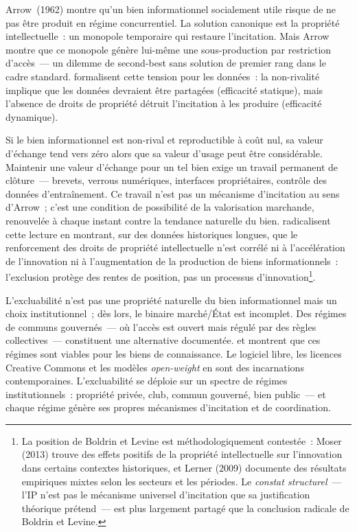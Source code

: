  Arrow~(1962) montre qu'un bien informationnel socialement utile risque de ne pas être produit en régime concurrentiel. La solution canonique est la propriété intellectuelle~: un monopole temporaire qui restaure l'incitation. Mais Arrow montre que ce monopole génère lui-même une sous-production par restriction d'accès~--- un dilemme de second-best sans solution de premier rang dans le cadre standard. \textcite{jones_nonrivalry_2020} formalisent cette tension pour les données~: la non-rivalité implique que les données devraient être partagées (efficacité statique), mais l'absence de droits de propriété détruit l'incitation à les produire (efficacité dynamique).

 Si le bien informationnel est non-rival et reproductible à coût nul, sa valeur d'échange tend vers zéro alors que sa valeur d'usage peut être considérable. Maintenir une valeur d'échange pour un tel bien exige un travail permanent de clôture~--- brevets, verrous numériques, interfaces propriétaires, contrôle des données d'entraînement. Ce travail n'est pas un mécanisme d'incitation au sens d'Arrow~; c'est une condition de possibilité de la valorisation marchande, renouvelée à chaque instant contre la tendance naturelle du bien. \textcite{boldrin_against_2008} radicalisent cette lecture en montrant, sur des données historiques longues, que le renforcement des droits de propriété intellectuelle n'est corrélé ni à l'accélération de l'innovation ni à l'augmentation de la production de biens informationnels~: l'exclusion protège des rentes de position, pas un processus d'innovation\footnote{La position de Boldrin et Levine est méthodologiquement contestée~: Moser (2013) trouve des effets positifs de la propriété intellectuelle sur l'innovation dans certains contextes historiques, et Lerner (2009) documente des résultats empiriques mixtes selon les secteurs et les périodes. Le \emph{constat structurel}~--- l'IP n'est pas le mécanisme universel d'incitation que sa justification théorique prétend~--- est plus largement partagé que la conclusion radicale de Boldrin et Levine.}.

 L'excluabilité n'est pas une propriété naturelle du bien informationnel mais un choix institutionnel~; dès lors, le binaire marché/État est incomplet. Des régimes de communs gouvernés~--- où l'accès est ouvert mais régulé par des règles collectives~--- constituent une alternative documentée. \textcite{ostrom_governing_1990} et \textcite{hess_understanding_2007} montrent que ces régimes sont viables pour les biens de connaissance. Le logiciel libre, les licences Creative Commons et les modèles \emph{open-weight} en sont des incarnations contemporaines. L'excluabilité se déploie sur un spectre de régimes institutionnels~: propriété privée, club, commun gouverné, bien public~--- et chaque régime génère ses propres mécanismes d'incitation et de coordination.

